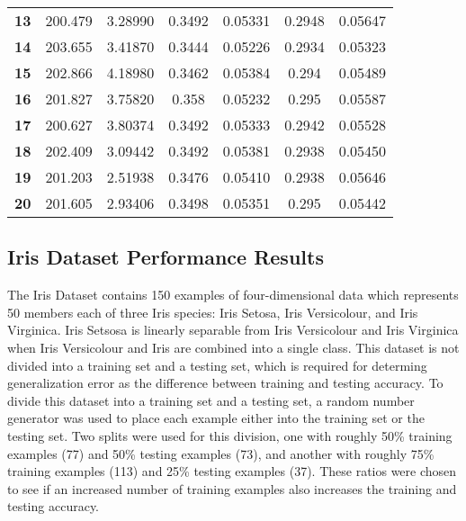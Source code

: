 \begin{table}[p]
\begin{center}
\begin{tabular}{l|c|c|c|c|c|c}
  \textbf{13} & 200.479 & 3.28990 & 0.3492 & 0.05331 & 0.2948 & 0.05647\\
  \textbf{14} & 203.655 & 3.41870 & 0.3444 & 0.05226 & 0.2934 & 0.05323\\
  \textbf{15} & 202.866 & 4.18980 & 0.3462 & 0.05384 & 0.294 & 0.05489\\
  \textbf{16} & 201.827 & 3.75820 & 0.358 & 0.05232 & 0.295 & 0.05587\\
  \textbf{17} & 200.627 & 3.80374 & 0.3492 & 0.05333 & 0.2942 & 0.05528\\
  \textbf{18} & 202.409 & 3.09442 & 0.3492 & 0.05381 & 0.2938 & 0.05450\\
  \textbf{19} & 201.203 & 2.51938 & 0.3476 & 0.05410 & 0.2938 & 0.05646\\
  \textbf{20} & 201.605 & 2.93406 & 0.3498 & 0.05351 & 0.295 & 0.05442\\
  \end{tabular}
 \end{center}
\end{table}

\subsection{Iris Dataset Performance Results}\label{IrisResults}
The Iris Dataset \cite{Fis36} contains 150 examples of four-dimensional data which represents 50 members each of three Iris species: Iris Setosa, Iris Versicolour, and Iris Virginica. Iris Setsosa is linearly separable from Iris Versicolour and Iris Virginica when Iris Versicolour and Iris are combined into a single class. This dataset is not divided into a training set and a testing set, which is required for determing generalization error as the difference between training and testing accuracy. To divide this dataset into a training set and a testing set, a random number generator was used to place each example either into the training set or the testing set. Two splits were used for this division, one with roughly 50\% training examples (77) and 50\% testing examples (73), and another with roughly 75\% training examples (113) and 25\% testing examples (37). These ratios were chosen to see if an increased number of training examples also increases the training and testing accuracy.

